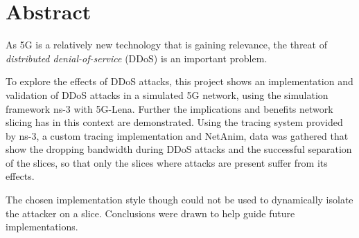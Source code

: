 
\thispagestyle{plain}

\section*{Abstract}

As 5G is a relatively new technology that is gaining relevance, the threat of \textit{distributed denial-of-service} (DDoS) is an important problem.

To explore the effects of DDoS attacks, this project shows an implementation and validation of DDoS attacks in a simulated 5G network, using the simulation framework ns-3 with 5G-Lena. Further the implications and benefits network slicing has in this context are demonstrated. 
Using the tracing system provided by ns-3, a custom tracing implementation and NetAnim, data was gathered that show the dropping bandwidth during DDoS attacks and the successful separation of the slices, so that only the slices where attacks are present suffer from its effects.

The chosen implementation style though could not be used to dynamically isolate the attacker on a slice. Conclusions were drawn to help guide future implementations.